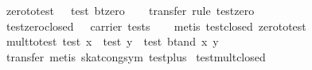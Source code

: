 \begin{isabellebody}
\endisatagproof
{\isafoldproof}%
%
\isadelimproof
\isanewline
%
\endisadelimproof
\isanewline
{}\isamarkupfalse%
\ zero{}to{}test{}\ {}{}\ {}\ test\ {}bt{}zero{}{}\isanewline
%
\isadelimproof
\ \ %
\endisadelimproof
%
\isatagproof
{}\isamarkupfalse%
\ {}transfer{}\ rule\ test{}zero{}%
\endisatagproof
{\isafoldproof}%
%
\isadelimproof
\isanewline
%
\endisadelimproof
\isanewline
{}\isamarkupfalse%
\ test{}zero{}closed{}\ {}{}\ {}\ carrier\ tests{}\isanewline
%
\isadelimproof
\ \ %
\endisadelimproof
%
\isatagproof
{}\isamarkupfalse%
\ {}metis\ test{}closed\ zero{}to{}test{}%
\endisatagproof
{\isafoldproof}%
%
\isadelimproof
\isanewline
%
\endisadelimproof
\isanewline
{}\isamarkupfalse%
\ mult{}to{}test{}\ {}test\ x\ {}\ test\ y\ {}\ test\ {}bt{}and\ x\ y{}{}\isanewline
%
\isadelimproof
\ \ %
\endisadelimproof
%
\isatagproof
{}\isamarkupfalse%
\ {}transfer{}\ metis\ skat{}cong{}sym\ test{}plus{}%
\endisatagproof
{\isafoldproof}%
%
\isadelimproof
\isanewline
%
\endisadelimproof
\isanewline
{}\isamarkupfalse%
\ test{}mult{}closed{}\isanewline

\end{isabellebody}
